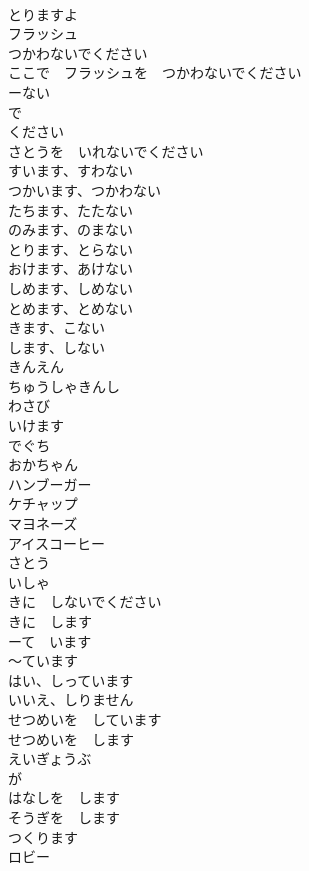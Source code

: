 \documentclass[8pt]{extreport}
\begin{document}
\begin{CJK}{UTF8}{min}
\\	とりますよ		
\\	フラッシュ		
\\	つかわないでください		
\\	ここで　フラッシュを　つかわないでください		
\\	ーない 
\\	で 
\\	ください		
\\	さとうを　いれないでください		
\\	すいます、すわない		
\\	つかいます、つかわない		
\\	たちます、たたない		
\\	のみます、のまない		
\\	とります、とらない		
\\	おけます、あけない		
\\	しめます、しめない		
\\	とめます、とめない		
\\	きます、こない		
\\	します、しない		
\\	きんえん		
\\	ちゅうしゃきんし		
\\	わさび		
\\	いけます		
\\	でぐち		
\\	おかちゃん		
\\	ハンブーガー		
\\	ケチャップ		
\\	マヨネーズ		
\\	アイスコーヒー		
\\	さとう		
\\	いしゃ		
\\	きに　しないでください		
\\	きに　します		
\\	ーて　います		
\\	〜ています		
\\	はい、しっています		
\\	いいえ、しりません		
\\	せつめいを　しています		
\\	せつめいを　します		
\\	えいぎょうぶ		
\\	が		
\\	はなしを　します		
\\	そうぎを　します		
\\	つくります		
\\	ロビー		

\end{CJK}
\end{document}
